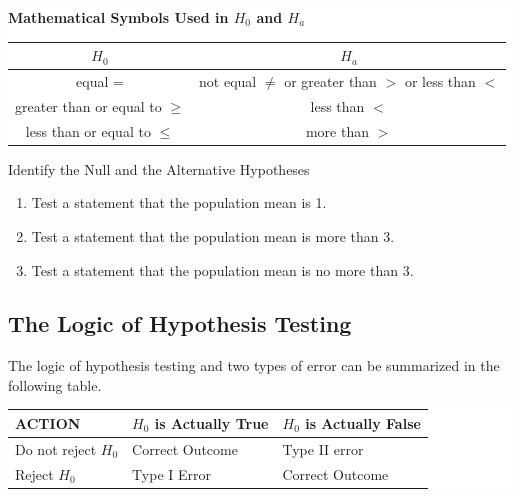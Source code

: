 \begin{fullwidth}
  \colorbox{white}{
    \parbox{\linewidth}{\centering
      \textbf{Mathematical Symbols Used in \(H_0\) and \(H_a\)}
      
      \begin{longtable}[]{@{}cc@{}}
      \toprule()
      \(H_0\) & \(H_a\) \\
      \midrule()
      \endhead
      equal = & not equal \(\neq\) or greater than $>$ or less than
      $<$\\
      greater than or equal to \(\geq\) & less than $<$ \\
      less than or equal to $\leq$ & more than $>$ \\
      \bottomrule()
      \end{longtable}
    }}
\end{fullwidth}

\begin{example}

Identify the Null and the Alternative Hypotheses

\begin{enumerate}
\item
  Test a statement that the population mean is 1.
\item
  Test a statement that the population mean is more than 3.
\item
  Test a statement that the population mean is no more than 3.
\end{enumerate}

\end{example}


\hypertarget{the-logic-of-hypothesis-testing}{%
\subsection{The Logic of Hypothesis
Testing}\label{the-logic-of-hypothesis-testing}}

The logic of hypothesis testing and two types of error can be summarized in the following table.

\begin{fullwidth}
  \colorbox{white}{
\parbox{\linewidth}{\centering
  \begin{tabular}{l|*{2}{l}}
    ACTION & $H_0$  is Actually True & $H_0$  is Actually False\\
    \midrule
    Do not reject  $H_0$ & 	Correct Outcome	 & Type II error\\
    Reject  $H_0$ &	Type I Error & Correct Outcome
  \end{tabular}
}
  }
\end{fullwidth}


